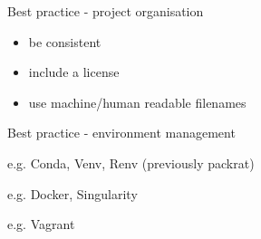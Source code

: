 \documentclass{beamer} %
\begin{document}
  \begin{frame}{Best practice - project organisation}
    \begin{itemize}
      \item be consistent
      \item include a license
      \item use machine/human readable filenames
    \end{itemize}
  \end{frame}


  \begin{frame}{Best practice - environment management}
    \begin{tcolorbox}[skin=beamer,adjusted title=Virtual environments]
      e.g. Conda, Venv, Renv (previously packrat)
    \end{tcolorbox}
    \begin{tcolorbox}[skin=beamer,adjusted title=Containers]
      e.g. Docker, Singularity
    \end{tcolorbox}
    \begin{tcolorbox}[skin=beamer,adjusted title=Virtual Machines]
      e.g. Vagrant
    \end{tcolorbox}    
  \end{frame}
  
\end{document}
